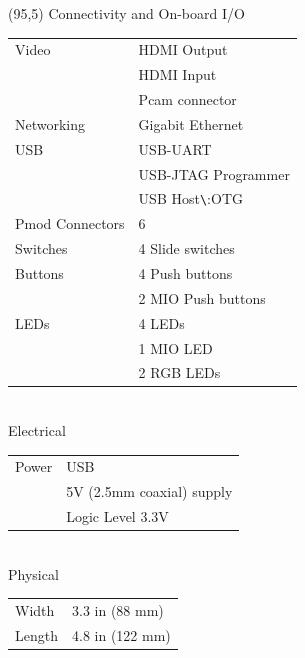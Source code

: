 \documentclass[aspectratio=169]{beamer}
\begin{document}
\begin{frame}[fragile,t]
    \begin{textblock}{85}(95,5)
    \small Connectivity and On-board I/O\\
    \vspace{0.1cm}
    \scriptsize
    \begin{tabular}{ll}
    Video & HDMI Output \\
        & HDMI Input \\
        & Pcam connector \\
    Networking & Gigabit Ethernet \\
    USB & USB-UART \\
        & USB-JTAG Programmer \\
        & USB Host\verb:\:OTG \\
    Pmod Connectors & 6 \\
    Switches & 4 Slide switches \\
    Buttons & 4 Push buttons \\
            & 2 MIO Push buttons \\
    LEDs & 4 LEDs \\
         & 1 MIO LED \\
         & 2 RGB LEDs \\
    \end{tabular}\\
    \vspace{0.2cm}
    \small Electrical\\
    \vspace{0.1cm}
    \scriptsize
    \begin{tabular}{ll}
    Power & USB \\
          & 5V (2.5mm coaxial) supply \\
          & Logic Level 3.3V \\
    \end{tabular}\\
    \vspace{0.2cm}
    \small Physical\\
    \vspace{0.1cm}
    \scriptsize
    \begin{tabular}{ll}
    Width  & 3.3 in (88 mm) \\
    Length & 4.8 in (122 mm) \\
    \end{tabular}\\
    \end{textblock}
\end{frame}
\end{document}
